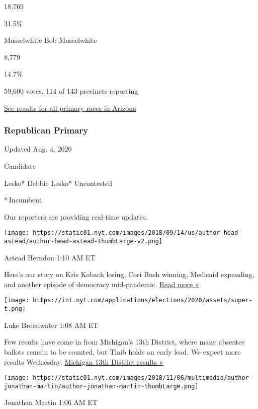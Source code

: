 18,769

31.5\%

 Musselwhite Bob Musselwhite

8,779

14.7\%

59,600 votes, 114 of 143 precincts reporting

\href{https://www.nytimes.com/interactive/2020/08/04/us/elections/results-arizona-primary-elections.html}{See
results for all primary races in Arizona}

\hypertarget{republican-primary}{%
\subsubsection{Republican Primary}\label{republican-primary}}

Updated Aug. 4, 2020

Candidate

 Lesko* Debbie Lesko* Uncontested

* Incumbent

Our reporters are providing real-time updates.

\texttt{[image: https://static01.nyt.com/images/2018/09/14/us/author-head-astead/author-head-astead-thumbLarge-v2.png]}

Astead Herndon 1:10 AM ET

Here's our story on Kris Kobach losing, Cori Bush winning, Medicaid
expanding, and another episode of democracy mid-pandemic.
\href{https://www.nytimes.com/2020/08/04/us/politics/kobach-tlaib.html?action=click\&module=ELEX_results\&pgtype=Interactive\&region=ReporterUpdates}{Read
more »}

\texttt{[image: https://int.nyt.com/applications/elections/2020/assets/super-t.png]}

Luke Broadwater 1:08 AM ET

Few results have come in from Michigan's 13th District, where many
absentee ballots remain to be counted, but Tlaib holds an early lead. We
expect more results Wednesday.
\href{https://www.nytimes.com/interactive/2020/08/04/us/elections/results-michigan-house-district-13-primary-election.html?action=click\&module=ELEX_results\&pgtype=Interactive\&region=ReporterUpdates}{Michigan
13th District results »}

\texttt{[image: https://static01.nyt.com/images/2018/11/06/multimedia/author-jonathan-martin/author-jonathan-martin-thumbLarge.png]}

Jonathan Martin 1:06 AM ET

